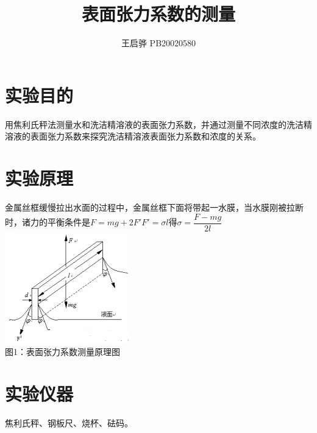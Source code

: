 \documentclass{report}
\title{表面张力系数的测量}
\author{王启骅 PB20020580}
\begin{document}
	\maketitle
	\section{实验目的}
	用焦利氏秤法测量水和洗洁精溶液的表面张力系数，并通过测量不同浓度的洗洁精溶液的表面张力系数来探究洗洁精溶液表面张力系数和浓度的关系。
	\section{实验原理}
金属丝框缓慢拉出水面的过程中，金属丝框下面将带起一水膜，当水膜刚被拉断时，诸力的平衡条件是$ F=mg+2F' $\quad$ F'=\sigma l $得$ \sigma=\dfrac{F-mg}{2l} $\\
\includegraphics[scale=1]{1}\\
图1：表面张力系数测量原理图
	
	\section{实验仪器}
焦利氏秤、钢板尺、烧杯、砝码。
\end{document}
